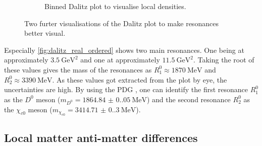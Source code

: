 \begin{figure}
\begin{subfigure}[b]{0.45\textwidth}
      \caption{Binned Dalitz plot to visualise local densities.}
      \label{fig:dalitz_real_binned}
  \end{subfigure}
     \caption{Two furter visualisations of the Dalitz plot to make resonances better visual.}
\end{figure}
Especially \autoref{fig:dalitz_real_ordered} shows two main resonances. One being at approximately $\qty{3.5}{\giga\electronvolt\squared}$ and one at approximately $\qty{11.5}{\giga\electronvolt\squared}$. Taking the root of these
values gives the mass of the resonances as $R^0_1 \approx \qty{1870}{\mega\electronvolt}$ and $R^0_2 \approx \qty{3390}{\mega\electronvolt}$. As these values got extracted from the plot by eye, the uncertainties are high. By using the
PDG \cite{PDG}, one can identify the first resonance $R^0_1$ as the $D^0$ meson ($m_{D^0} = \qty{1864.84(0.05)}{\mega\electronvolt}$\cite{PDG}) and the second resonance $R^0_2$ as the $\chi_{c0}$ meson ($m_{\chi_{c0}} = \qty{3414.71(0.30)}{\mega\electronvolt}$\cite{PDG}).

\subsection{Local matter anti-matter differences}

